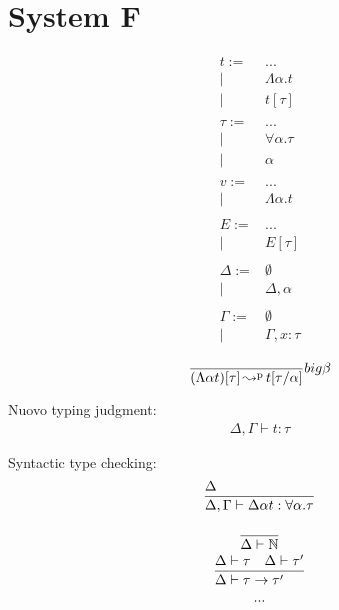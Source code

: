\documentclass{article}
\newcommand{\st}[3][]{\ensuremath \displaystyle\frac{#3\hfill}{#2\hfill} \text{#1}}
\newcommand{\N}{\ensuremath \mathbb N}
\begin{document}
\section{System F}
\begin{align*}
    t :=& ... \\
    |& \Lambda\alpha.t \\
    |& t[\tau] \\
    \\
    \tau :=& ... \\
    |& \forall \alpha.\tau \\
    |& \alpha \\
    \\
    v :=& ... \\
    |& \Lambda\alpha.t \\
    \\
    E :=& ... \\
    |& E[\tau] \\
    \\
    \Delta :=& \emptyset \\
    |& \Delta,\alpha \\
    \\
    \Gamma :=& \emptyset \\
    |& \Gamma,x:\tau
\end{align*}

\begin{align*}
    \st[$big\beta$]{(\Lambda\alpha t)[\tau] \credp t[\tau/\alpha]}{}
\end{align*}

Nuovo typing judgment:
\begin{align*}
    \Delta,\Gamma\vdash t:\tau
\end{align*}

Syntactic type checking:
\begin{align*}
    \st{\Delta,\Gamma\vdash \Delta\alpha t:\forall\alpha.\tau}{\Delta}
\end{align*}

\begin{gather*}
    \st{\Delta\vdash\N}{} \\
    \st{\Delta\vdash\tau\to\tau'}{\Delta\vdash\tau\quad \Delta\vdash\tau'} \\
    ...
\end{gather*}

\end{document}
